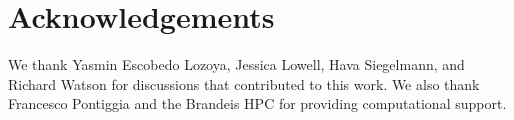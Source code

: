 \documentclass[conference]{IEEEtran}
\begin{document}
\section{Acknowledgements}

We thank Yasmin Escobedo Lozoya, Jessica Lowell, Hava Siegelmann, and Richard
Watson for discussions that contributed to this work. We also thank Francesco
Pontiggia and the Brandeis HPC for providing computational support. 


%


%
\end{document}
